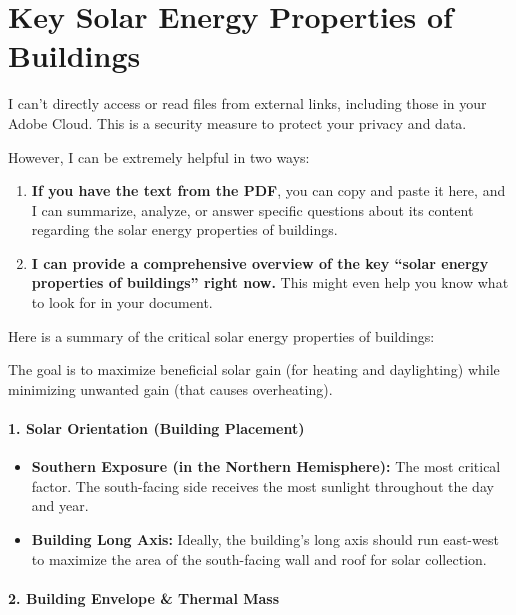 \documentclass[
  10pt,
  letterpaper,
]{scrbook}
\providecommand{\tightlist}{%
  \setlength{\itemsep}{0pt}\setlength{\parskip}{0pt}}
\begin{document}
\chapter{Key Solar Energy Properties of
Buildings}\label{key-solar-energy-properties-of-buildings}

I can't directly access or read files from external links, including
those in your Adobe Cloud. This is a security measure to protect your
privacy and data.

However, I can be extremely helpful in two ways:

\begin{enumerate}
\def\labelenumi{\arabic{enumi}.}
\item
  \textbf{If you have the text from the PDF}, you can copy and paste it
  here, and I can summarize, analyze, or answer specific questions about
  its content regarding the solar energy properties of buildings.
\item
  \textbf{I can provide a comprehensive overview of the key ``solar
  energy properties of buildings'' right now.} This might even help you
  know what to look for in your document.
\end{enumerate}

Here is a summary of the critical solar energy properties of buildings:

The goal is to maximize beneficial solar gain (for heating and
daylighting) while minimizing unwanted gain (that causes overheating).

\subsubsection{1. Solar Orientation (Building
Placement)}\label{solar-orientation-building-placement}

\begin{itemize}
\tightlist
\item
  \textbf{Southern Exposure (in the Northern Hemisphere):} The most
  critical factor. The south-facing side receives the most sunlight
  throughout the day and year.
\item
  \textbf{Building Long Axis:} Ideally, the building's long axis should
  run east-west to maximize the area of the south-facing wall and roof
  for solar collection.
\end{itemize}

\subsubsection{2. Building Envelope \& Thermal
Mass}\label{building-envelope-thermal-mass}
\end{document}
